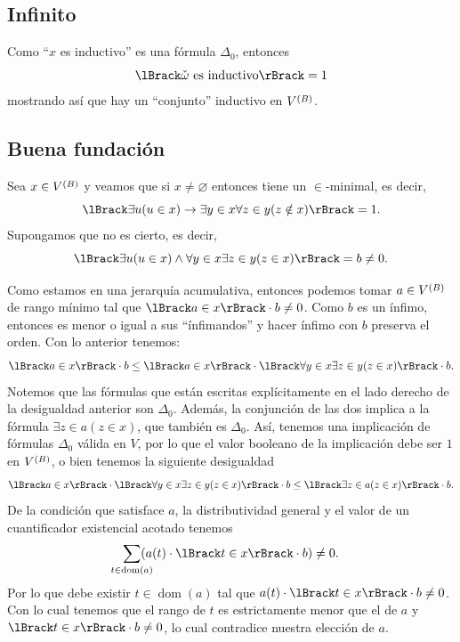 \documentclass[letterpaper,DIV=15,12pt]{scrartcl}
\theoremstyle{manual}
\renewcommand{\emptyset}{\varnothing}
\DeclarePairedDelimiter{\vb}{\lBrack}{\rBrack}             %
\DeclareMathOperator{\dom}{dom}                            %
\begin{document}
\subsection{Infinito}
Como \enquote{\(x\) es inductivo} es una fórmula \(\Delta_{0}\), entonces
\begin{equation*}
  \vb{\check{\omega}\text{ es inductivo}}=1
\end{equation*}
mostrando así que hay un \enquote{conjunto} inductivo en \(\mb\).


\subsection{Buena fundación}
Sea \(x\in\mb\) y veamos que si \(x\ne\emptyset\) entonces tiene un
\(\in\)-minimal, es decir,
\begin{equation*}
  \vb{\exists u(u\in x)\to\exists y\in x\forall z\in y(z\notin x)}=1.
\end{equation*}
Supongamos que no es cierto, es decir,
\begin{equation*}
  \vb{\exists u(u\in x)\land\forall y\in x\exists z\in y(z\in x)}=b\ne 0.
\end{equation*}

Como estamos en una jerarquía acumulativa, entonces podemos tomar \(a\in\mb\) de
rango mínimo tal que \(\vb{a\in x}\cdot b\ne 0\). Como \(b\) es un ínfimo,
entonces es menor o igual a sus \enquote{ínfimandos} y hacer ínfimo con \(b\)
preserva el orden. Con lo anterior tenemos:
\begin{equation*}
  \vb{a\in x}\cdot b\leq
  \vb{a\in x}\cdot\vb{\forall y\in x\exists z\in y(z\in x)}\cdot b.
\end{equation*}
Notemos que las fórmulas que están escritas explícitamente en el lado derecho de
la desigualdad anterior son \(\Delta_{0}\). Además, la conjunción de las dos implica a
la fórmula \(\exists z\in a(z\in x)\), que también es \(\Delta_{0}\). Así,
tenemos una implicación de fórmulas \(\Delta_{0}\) válida en \(V\), por lo que
el valor booleano de la implicación debe ser \(1\) en \(\mb\), o bien tenemos la
siguiente desigualdad
\begin{equation*}
  \vb{a\in x}\cdot\vb{\forall y\in x\exists z\in y(z\in x)}\cdot b \leq
  \vb{\exists z\in a(z\in x)}\cdot b.
\end{equation*}
De la condición que satisface \(a\), la distributividad general y el valor de un
cuantificador existencial acotado tenemos
\begin{equation*}
  \smashoperator{\sum_{t\in\dom(a)}}(a(t)\cdot\vb{t\in x}\cdot b)\ne 0.
\end{equation*}
Por lo que debe existir \(t\in\dom(a)\) tal que 
\(a(t)\cdot\vb{t\in x}\cdot b\ne 0\). Con lo cual tenemos que el rango de \(t\)
es estrictamente menor que el de \(a\) y \(\vb{t\in x}\cdot b\ne 0\), lo cual
contradice nuestra elección de \(a\).
\end{document}

